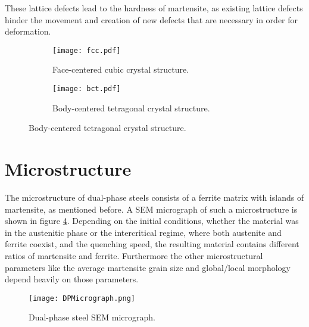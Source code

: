 These lattice defects lead to the hardness of martensite, as existing lattice defects hinder the movement and creation of new defects that are necessary in order for deformation.

\begin{figure}[H]
\begin{subfigure}{.5\textwidth}
\texttt{[image: fcc.pdf]}
\caption{Face-centered cubic crystal structure.}
\label{sub:fcc}
\end{subfigure}
\begin{subfigure}{.5\textwidth}
\texttt{[image: bct.pdf]}
\caption{Body-centered tetragonal crystal structure.}
\label{sub:bct}
\end{subfigure}
\label{fig:crystalStructures}
\end{figure}


\section{Microstructure}

The microstructure of dual-phase steels consists of a ferrite matrix with islands of martensite, as mentioned before. A SEM micrograph of such a microstructure is shown in figure \ref{fig:DPMicrostructure}. Depending on the initial conditions, whether the material was in the austenitic phase or the intercritical regime, where both austenite and ferrite coexist, and the quenching speed, the resulting material contains different ratios of martensite and ferrite. Furthermore the other microstructural parameters like the average martensite grain size and global/local morphology depend heavily on those parameters.  

\begin{figure}[H]
\centering
  \texttt{[image: DPMicrograph.png]}
  \caption{Dual-phase steel SEM micrograph.}
  \label{fig:DPMicrostructure}
\end{figure}

%
%



